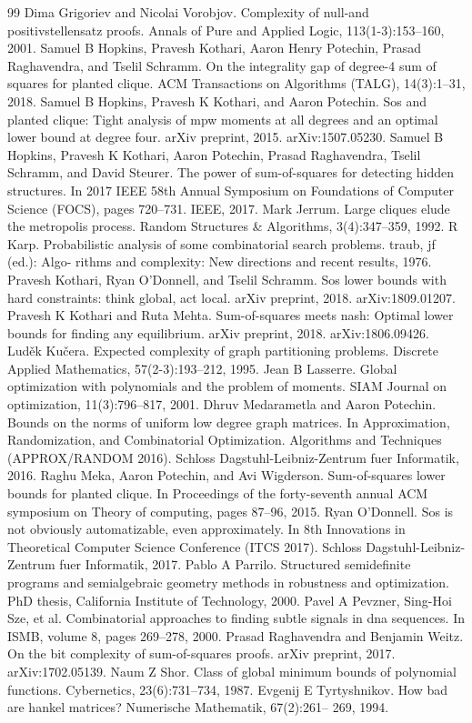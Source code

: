\begin{thebibliography}{99}
 Dima Grigoriev and Nicolai Vorobjov. Complexity of null-and positivstellensatz proofs. Annals of Pure and Applied Logic, 113(1-3):153–160, 2001.
 Samuel B Hopkins, Pravesh Kothari, Aaron Henry Potechin, Prasad Raghavendra, and Tselil Schramm. On the integrality gap of degree-4 sum of squares for planted clique. ACM Transactions on Algorithms (TALG), 14(3):1–31, 2018.
 Samuel B Hopkins, Pravesh K Kothari, and Aaron Potechin. Sos and planted clique: Tight analysis of mpw moments at all degrees and an optimal lower bound at degree four. arXiv preprint, 2015. arXiv:1507.05230.
 Samuel B Hopkins, Pravesh K Kothari, Aaron Potechin, Prasad Raghavendra, Tselil Schramm, and David Steurer. The power of sum-of-squares for detecting hidden structures. In 2017 IEEE 58th Annual Symposium on Foundations of Computer Science (FOCS), pages 720–731. IEEE, 2017.
 Mark Jerrum. Large cliques elude the metropolis process. Random Structures \& Algorithms, 3(4):347–359, 1992.
 R Karp. Probabilistic analysis of some combinatorial search problems. traub, jf (ed.): Algo- rithms and complexity: New directions and recent results, 1976.
 Pravesh Kothari, Ryan O’Donnell, and Tselil Schramm. Sos lower bounds with hard constraints: think global, act local. arXiv preprint, 2018. arXiv:1809.01207.
 Pravesh K Kothari and Ruta Mehta. Sum-of-squares meets nash: Optimal lower bounds for finding any equilibrium. arXiv preprint, 2018. arXiv:1806.09426.
 Luděk Kučera. Expected complexity of graph partitioning problems. Discrete Applied Mathematics, 57(2-3):193–212, 1995.
 Jean B Lasserre. Global optimization with polynomials and the problem of moments. SIAM Journal on optimization, 11(3):796–817, 2001.
 Dhruv Medarametla and Aaron Potechin. Bounds on the norms of uniform low degree graph matrices. In Approximation, Randomization, and Combinatorial Optimization. Algorithms and Techniques (APPROX/RANDOM 2016). Schloss Dagstuhl-Leibniz-Zentrum fuer Informatik, 2016.
 Raghu Meka, Aaron Potechin, and Avi Wigderson. Sum-of-squares lower bounds for planted clique. In Proceedings of the forty-seventh annual ACM symposium on Theory of computing, pages 87–96, 2015.
 Ryan O’Donnell. Sos is not obviously automatizable, even approximately. In 8th Innovations in Theoretical Computer Science Conference (ITCS 2017). Schloss Dagstuhl-Leibniz-Zentrum fuer Informatik, 2017.
 Pablo A Parrilo. Structured semidefinite programs and semialgebraic geometry methods in robustness and optimization. PhD thesis, California Institute of Technology, 2000.
 Pavel A Pevzner, Sing-Hoi Sze, et al. Combinatorial approaches to finding subtle signals in dna sequences. In ISMB, volume 8, pages 269–278, 2000.
 Prasad Raghavendra and Benjamin Weitz. On the bit complexity of sum-of-squares proofs. arXiv preprint, 2017. arXiv:1702.05139.
 Naum Z Shor. Class of global minimum bounds of polynomial functions. Cybernetics, 23(6):731–734, 1987.
 Evgenij E Tyrtyshnikov. How bad are hankel matrices? Numerische Mathematik, 67(2):261– 269, 1994.
\end{thebibliography}
